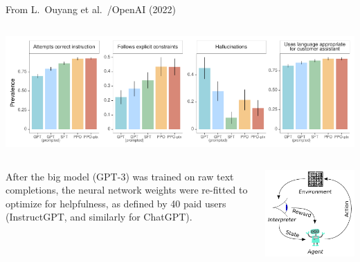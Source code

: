 \documentclass[aspectratio=169]{beamer}
\begin{document}
\begin{frame}{From L.\ Ouyang et al.\ /OpenAI (2022)}
\large
\vspace{0.4 cm}
\begin{columns}
\includegraphics[width=\linewidth]{fine-tuning-for-chat-results.pdf}
\end{columns}

\vspace{0.2 cm}
\begin{columns}
After the big model (GPT-3) was trained on raw text completions, the neural network weights were re-fitted to optimize for helpfulness, as defined by 40 paid users (InstructGPT, and similarly for ChatGPT).

\includegraphics[width=\linewidth]{Reinforcement_learning_diagram.pdf}
\end{columns}
\end{frame}
\end{document}
